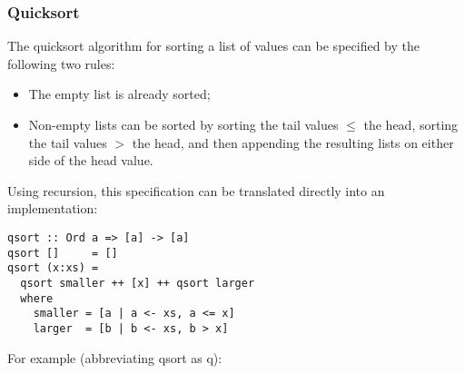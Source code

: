 \begin{multicols}{2}
\subsubsection{Quicksort}
The quicksort algorithm for sorting a list of values can be specified by the following two rules:
\begin{itemize}
  \item The empty list is already sorted;
  \item Non-empty lists can be sorted by sorting the tail values $\leq$ the head, sorting the tail values $>$ the head, and then appending the resulting lists on either side of the head value.
\end{itemize}

Using recursion, this specification can be translated directly into an implementation:
\begin{lstlisting}
qsort :: Ord a => [a] -> [a]
qsort []     = []
qsort (x:xs) =
  qsort smaller ++ [x] ++ qsort larger
  where
    smaller = [a | a <- xs, a <= x]
    larger  = [b | b <- xs, b > x]
\end{lstlisting}

For example (abbreviating qsort as q):


\end{multicols}
